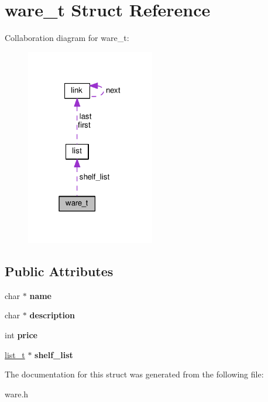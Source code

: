 \hypertarget{structware__t}{}\section{ware\+\_\+t Struct Reference}
\label{structware__t}


Collaboration diagram for ware\+\_\+t\+:
\nopagebreak
\begin{figure}[H]
\begin{center}
\leavevmode
\includegraphics[width=159pt]{structware__t__coll__graph}
\end{center}
\end{figure}
\subsection*{Public Attributes}
\begin{DoxyCompactItemize}
\item 
char $\ast$ {\bfseries name}\hypertarget{structware__t_ae3630d1ec6e5c59be2b14f07a0deb8ca}{}\label{structware__t_ae3630d1ec6e5c59be2b14f07a0deb8ca}

\item 
char $\ast$ {\bfseries description}\hypertarget{structware__t_a14244f153d4dc3ea1700ea75fb716626}{}\label{structware__t_a14244f153d4dc3ea1700ea75fb716626}

\item 
int {\bfseries price}\hypertarget{structware__t_a6a2d989398ac414ccd19c6eaf9462e7c}{}\label{structware__t_a6a2d989398ac414ccd19c6eaf9462e7c}

\item 
\hyperlink{list_8h_a15376354e4e8b4f1732e9df17f30786c}{list\+\_\+t} $\ast$ {\bfseries shelf\+\_\+list}\hypertarget{structware__t_a11fe121f07b461a1d3eb25e384b12bab}{}\label{structware__t_a11fe121f07b461a1d3eb25e384b12bab}

\end{DoxyCompactItemize}


The documentation for this struct was generated from the following file\+:\begin{DoxyCompactItemize}
\item 
ware.\+h\end{DoxyCompactItemize}
